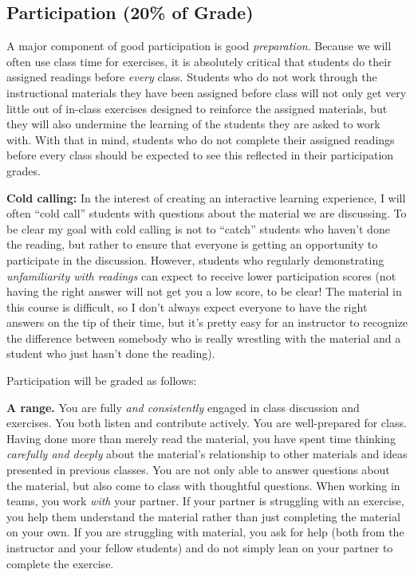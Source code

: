 \documentclass[12pt]{article}
\begin{document}
\subsection{Participation (20\% of Grade)}

A major component of good participation is good \emph{preparation}. Because we will often use class time for exercises, it is absolutely critical that students do their assigned readings before \emph{every} class. Students who do not work through the instructional materials they have been assigned before class will not only get very little out of in-class exercises designed to reinforce the assigned materials, but they will also undermine the learning of the students they are asked to work with. With that in mind, students who do not complete their assigned readings before every class should be expected to see this reflected in their participation grades.

\textbf{Cold calling:} In the interest of creating an interactive learning experience, I will often ``cold call'' students with questions about the material we are discussing. To be clear my goal with cold calling is not to ``catch'' students who haven't done the reading, but rather to ensure that everyone is getting an opportunity to participate in the discussion. However, students who regularly demonstrating \emph{unfamiliarity with readings} can expect to receive lower participation scores (not having the right answer will not get you a low score, to be clear! The material in this course is difficult, so I don't always expect everyone to have the right answers on the tip of their time, but it's pretty easy for an instructor to recognize the difference between somebody who is really wrestling with the material and a student who just hasn't done the reading). 

Participation will be graded as follows:

\textbf{A range.}  You are fully \emph{and consistently} engaged in class discussion and exercises.  You both listen and contribute actively.  You are well-prepared for class.  Having done more than merely read the material, you have spent time thinking \emph{carefully and deeply} about the material's relationship to other materials and ideas presented in previous classes. You are not only able to answer questions about the material, but also come to class with thoughtful questions.  When working in teams, you work \emph{with} your partner. If your partner is struggling with an exercise, you help them understand the material rather than just completing the material on your own. If you are struggling with material, you ask for help (both from the instructor and your fellow students) and do not simply lean on your partner to complete the exercise. \\
\end{document}
